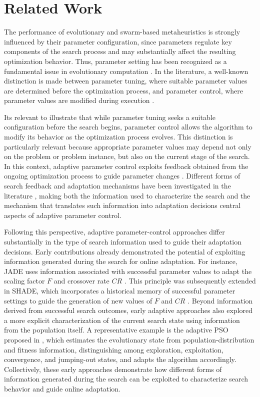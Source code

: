 \documentclass[journal,article,submit,moreauthors]{Definitions/mdpi}
\begin{document}
\section{Related Work}

The performance of evolutionary and swarm-based metaheuristics is strongly influenced by their parameter configuration, since parameters regulate key components of the search process and may substantially affect the resulting optimization behavior. Thus, parameter setting has been recognized as a fundamental issue in evolutionary computation \cite{eiben-1999,talbi-2009}. In the literature, a well-known distinction is made between parameter tuning, where suitable parameter values are determined before the optimization process, and parameter control, where parameter values are modified during execution \cite{talbi2021,huang2019survey}.

Its relevant to illustrate that while parameter tuning seeks a suitable configuration before the search begins, parameter control allows the algorithm to modify its behavior as the optimization process evolves. This distinction is particularly relevant because appropriate parameter values may depend not only on the problem or problem instance, but also on the current stage of the search. In this context, adaptive parameter control exploits feedback obtained from the ongoing optimization process to guide parameter changes \cite{aleti2016systematic}. Different forms of search feedback and adaptation mechanisms have been investigated in the literature \cite{de2021,karafotias2014}, making both the information used to characterize the search and the mechanism that translates such information into adaptation decisions central aspects of adaptive parameter control.

Following this perspective, adaptive parameter-control approaches differ
substantially in the type of search information used to guide their
adaptation decisions. Early contributions already demonstrated the potential
of exploiting information generated during the search for online adaptation.
For instance, JADE uses information associated with successful parameter
values to adapt the scaling factor $F$ and crossover rate $CR$
\cite{zhang2009jade}. This principle was subsequently extended in SHADE,
which incorporates a historical memory of successful parameter settings to
guide the generation of new values of $F$ and $CR$
\cite{tanabe2013success}. Beyond information derived from successful search
outcomes, early adaptive approaches also explored a more explicit
characterization of the current search state using information from the
population itself. A representative example is the adaptive PSO proposed in \cite{zhan2009adaptive}, which estimates the evolutionary state from population-distribution and fitness information, distinguishing among exploration, exploitation,
convergence, and jumping-out states, and adapts the algorithm accordingly. Collectively, these early approaches demonstrate how different forms of information generated during the search can be exploited to characterize search behavior and guide online adaptation.
\end{document}
